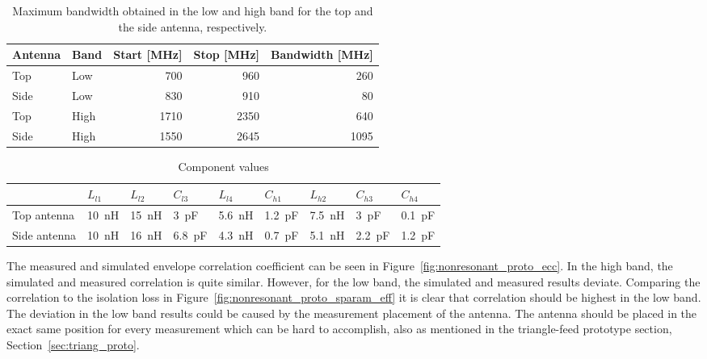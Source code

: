    \begin{table}
      \centering
      \begin{tabular}{|l|l|r|r|r|}
        \hline
        Antenna & Band & Start [MHz] & Stop [MHz] & Bandwidth [MHz] \\
        \hline
        Top     & Low  & 700        & 960       & 260 \\
        Side    & Low  & 830         & 910        & 80 \\
        \hline
        Top     & High & 1710        & 2350       & 640 \\
        Side    & High & 1550        & 2645       & 1095 \\
        \hline
      \end{tabular}
      \caption{Maximum bandwidth obtained in the low and high band for the top and the side antenna, respectively.}
      \label{tab:bw_sol3_proto}
    \end{table}

\begin{table}
  \centering
        \begin{tabular}{|l|l|l|l|l|l|l|l|l|}
            \hline
                         & $L_{l1}$       & $L_{l2}$        & $C_{l3}$      & $L_{l4}$       & $C_{h1}$       & $L_{h2}$      & $C_{h3}$      & $C_{h4}$    \\
            \hline
            Top antenna  & \SI{10}{nH}  & \SI{15}{nH}  & \SI{3}{pF} & \SI{5.6}{nH} & \SI{1.2}{pF} & \SI{7.5}{nH} & \SI{3}{pF} & \SI{0.1}{pF} \\
            Side antenna & \SI{10}{nH}  & \SI{16}{nH}  & \SI{6.8}{pF} & \SI{4.3}{nH} & \SI{0.7}{pF} & \SI{5.1}{nH} & \SI{2.2}{pF} & \SI{1.2}{pF} \\
            \hline
        \end{tabular}
        \caption{Component values}
        \label{fig:ant3schematic_proto}
\end{table}

The measured and simulated envelope correlation coefficient can be seen in Figure~\ref{fig:nonresonant_proto_ecc}. In the high band, the simulated and measured correlation is quite similar. However, for the low band, the simulated and measured results deviate. Comparing the correlation to the isolation loss in Figure~\ref{fig:nonresonant_proto_sparam_eff} it is clear that correlation should be highest in the low band. The deviation in the low band results could be caused by the measurement placement of the antenna. The antenna should be placed in the exact same position for every measurement which can be hard to accomplish, also as mentioned in the triangle-feed prototype section, Section~\ref{sec:triang_proto}.

